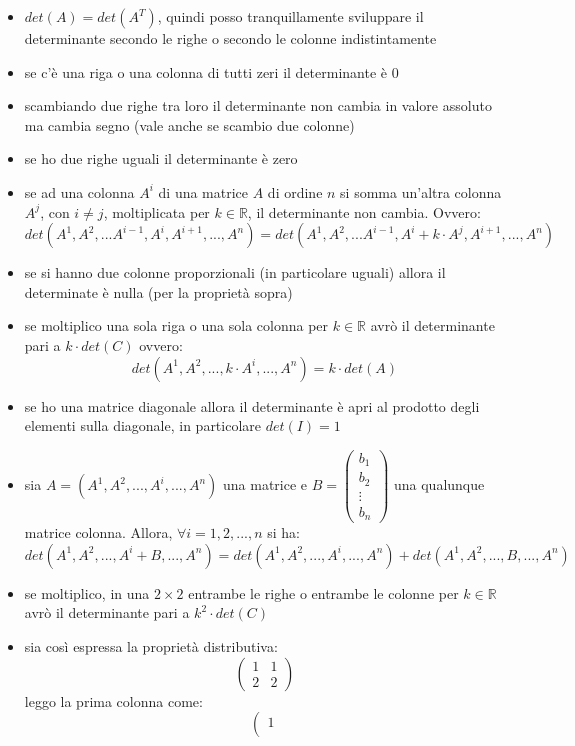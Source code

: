 \documentclass[a4paper,12pt, oneside]{book}
\begin{document}
\begin{itemize}
\item $det(A)=det(A^T)$, quindi posso tranquillamente sviluppare il determinante secondo le righe o secondo le colonne indistintamente
\item se c'è una riga o una colonna di tutti zeri il determinante è 0
\item scambiando due righe tra loro il determinante non cambia in valore assoluto ma cambia segno (vale anche se scambio due colonne)
\item se ho due righe uguali il determinante è zero
\item se ad una colonna $A^i$ di una matrice $A$ di ordine $n$ si somma un'altra colonna $A^j$, con $i\neq j$, moltiplicata per $k\in \mathbb{R}$, il determinante non cambia. Ovvero:
$$det(A^1,A^2,...A^{i-1},A^i,A^{i+1},...,A^n)=det(A^1,A^2,...A^{i-1},A^i+k\cdot A^j,A^{i+1},...,A^n)$$
\item se si hanno due colonne proporzionali (in particolare uguali) allora il determinate è nulla (per la proprietà sopra)
\item se moltiplico una sola riga o una sola colonna per $k\in\mathbb{R}$ avrò il determinante pari a $k\cdot det(C)$ ovvero:
$$det(A^1,A^2,...,k\cdot A^i,...,A^n)=k\cdot det(A)$$
\item se ho una matrice diagonale allora il determinante è apri al prodotto degli elementi sulla diagonale, in particolare $det(I)=1$
\item sia $A=(A^1,A^2,...,A^i,...,A^n)$ una matrice e $
B=\left(\begin{matrix}
b_1\\
b_2\\
\vdots\\
b_n
\end{matrix}\right)
$ una qualunque matrice colonna. Allora, $\forall i=1,2,...,n$ si ha:
$$det(A^1,A^2,...,A^i+B,...,A^n)=det(A^1,A^2,..., A^i,...,A^n)+det(A^1,A^2,...,B,...,A^n)$$
\item se moltiplico, in una $2\times 2$ entrambe le righe o entrambe le colonne per $k\in\mathbb{R}$ avrò il determinante pari a $k^2\cdot det(C)$
\item sia così espressa la proprietà distributiva:
$$
\left(
\begin{matrix}
1 & 1\\
2 & 2
\end{matrix}
\right)
$$
leggo la prima colonna come:
$$
\left(
\begin{matrix}
1\\

\end{matrix}$$
\end{itemize}
\end{document}

